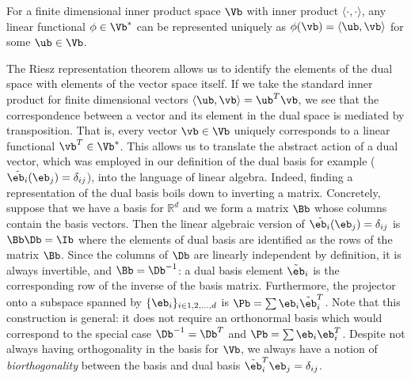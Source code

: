 \documentclass{article}
\begin{document}
\begin{theorem}
    For a finite dimensional inner product space $\Vb$ with inner product $\langle \cdot, \cdot\rangle$, any linear functional $\phi \in \Vb^*$ can be represented uniquely as $\phi(\vb) = \langle \ub, \vb \rangle$ for some $\ub \in \Vb$. 
\end{theorem}

The Riesz representation theorem allows us to identify the elements of the dual space with elements of the vector space itself. If we take the standard inner product for finite dimensional vectors $\langle \ub, \vb \rangle = \ub^T \vb$, we see that the correspondence between a vector and its element in the dual space is mediated by transposition. That is, every vector $\vb \in \Vb$ uniquely corresponds to a linear functional $\vb^T \in \Vb^*$. This allows us to translate the abstract action of a dual vector, which was employed in our definition of the dual basis for example ($\tilde{\eb_i}(\eb_j) = \delta_{ij}$), into the language of linear algebra. Indeed, finding a representation of the dual basis boils down to inverting a matrix. Concretely, suppose that we have a basis for $\mathbb{R}^d$ and we form a matrix $\Bb$ whose columns contain the basis vectors. Then the linear algebraic version of $\tilde{\eb_i}(\eb_j) = \delta_{ij}$ is $\Bb \Db = \Ib$ where the elements of dual basis are identified as the rows of the matrix $\Bb$. Since the columns of $\Db$ are linearly independent by definition, it is always invertible, and $\Bb = \Db^{-1}$: a dual basis element $\tilde{\eb}_i$ is the corresponding row of the inverse of the basis matrix. Furthermore, the projector onto a subspace spanned by $\{\eb_i\}_{i \in 1,2,\dots,d}$ is $\Pb = \sum \eb_i \tilde{\eb}_i^T$. Note that this construction is general: it does not require an orthonormal basis which would correspond to the special case $\Db^{-1} = \Db^T$ and $\Pb = \sum \eb_i \eb_i^T$. Despite not always having orthogonality in the basis for $\Vb$, we always have a notion of \textit{biorthogonality} between the basis and dual basis $\tilde{\eb}_i^T\eb_j = \delta_{ij}$. 
\end{document}
